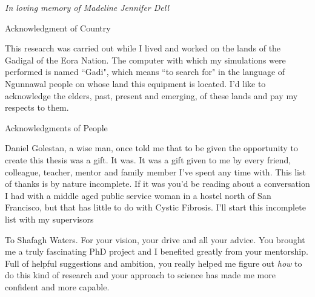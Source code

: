 \newpage


\thispagestyle{empty}


\begin{center}
	\vspace*{\fill}
\textit {In loving memory of Madeline Jennifer Dell} \\
	\vspace*{\fill}
\end{center}

\clearpage


\begin{center}
\begin{Large}
\begin{bfseries}
Acknowledgment of Country
\end{bfseries}
\end{Large}
\end{center}
This research was carried out while I lived and worked on the lands of the Gadigal of the Eora Nation. The computer with which my simulations were performed is named ``Gadi", which means ``to search for" in the language of Ngunnawal people on whose land this equipment is located. I'd like to acknowledge the elders, past, present and emerging, of these lands and pay my respects to them.
\begin{center}
\begin{Large}
\begin{bfseries}
Acknowledgments of People
\end{bfseries}
\end{Large}
\end{center}
 Daniel Golestan, a wise man, once told me that to be given the opportunity to create this thesis was a gift. It was. It was a gift given to me by every friend, colleague, teacher, mentor and family member I've spent any time with. This list of thanks is by nature incomplete. If it was you'd be reading about a conversation I had with a middle aged public service woman in a hostel north of San Francisco, but that has little to do with Cystic Fibrosis. I'll start this incomplete list with my supervisors

To Shafagh Waters. For your vision, your drive and all your advice. You brought me a truly fascinating PhD project and I benefited greatly from your mentorship. Full of helpful suggestions and ambition, you really helped me figure out \textit{how} to do this kind of research and your approach to science has made me more confident and more capable.

